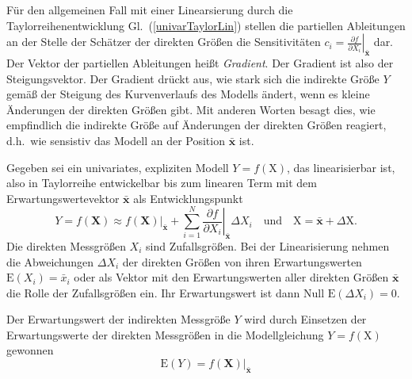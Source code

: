 Für den allgemeinen Fall mit einer Linearsierung durch die Taylorreihenentwicklung
Gl.~(\ref{univarTaylorLin}) stellen die partiellen Ableitungen an
der Stelle der Schätzer der direkten Größen die Sensitivitäten
$c_i = \left. \frac{\partial f}{\partial X_i} \right|_{\bar{\mathbf{x}}}$ dar. Der
Vektor der partiellen Ableitungen heißt \textsl{Gradient}. Der Gradient ist also
der Steigungsvektor.
Der Gradient drückt aus, wie stark sich die indirekte Größe $Y$ gemäß der Steigung
des Kurvenverlaufs des Modells
ändert, wenn es kleine Änderungen der direkten Größen gibt. Mit anderen Worten besagt dies, wie
empfindlich die indirekte Größe auf Änderungen der direkten Größen reagiert, d.h.\ wie sensistiv
das Modell an der Position $\bar{\mathbf{x}}$ ist.

Gegeben sei ein univariates, expliziten Modell $Y = f(\mathrm{X})$, das linearisierbar ist, also
in Taylorreihe entwickelbar bis zum linearen Term mit dem Erwartungswertevektor
$\bar{\mathbf{x}}$ als Entwicklungspunkt
\begin{equation}
Y = f(\mathbf{X}) \approx \left. f(\mathbf{X}) \right|_{\bar{\mathbf{x}}} +
\sum_{i=1}^N \left.
\frac{\partial f}{\partial X_i} \right|_{\bar{\mathbf{x}}} \Delta X_i
\quad \text{und} \quad \mathrm{X} = \bar{\mathbf{x}} + \Delta \mathrm{X} .
\label{linearisiertesModellY}
\end{equation}
Die direkten Messgrößen $X_i$ sind Zufallsgrößen.
Bei der Linearisierung nehmen die Abweichungen $\Delta X_i$ der direkten Größen von ihren Erwartungswerten
$\mathrm{E}(X_i) = \bar x_i$ oder als Vektor mit den Erwartungswerten aller direkten Größen
$\bar{\mathbf{x}}$ die Rolle der Zufallsgrößen ein. Ihr Erwartungswert ist dann
Null $\mathrm{E}(\Delta X_i) = 0$.

Der Erwartungswert der indirekten Messgröße $Y$ wird durch Einsetzen der Erwartungswerte der
direkten Messgrößen in die Modellgleichung $Y = f(\mathrm{X})$ gewonnen
\begin{equation}
\mathrm{E}(Y) = \left. f(\mathbf{X}) \right|_{\bar{\mathbf{x}}}
\end{equation}

